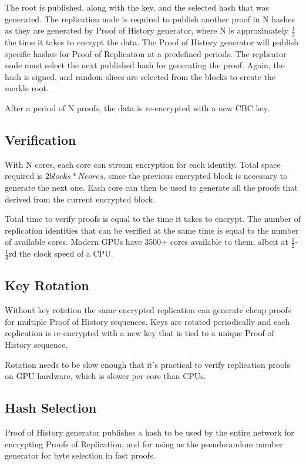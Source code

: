 \documentclass[12pt]{article}
\begin{document}
The root is published, along with the key, and the selected hash that was generated.  The replication node is required to publish another proof in N hashes as they are generated by Proof of History generator, where N is approximately \(\frac{1}{2}\) the time it takes to encrypt the data.  The Proof of History generator will publish specific hashes for Proof of Replication at a predefined periods.  The replicator node must select the next published hash for generating the proof.  Again, the hash is signed, and random slices are selected from the blocks to create the merkle root.

After a period of N proofs, the data is re-encrypted with a new CBC key.
\subsection{Verification}

With N cores, each core can stream encryption for each identity.  Total space required is \(2 blocks * N cores\), since the previous encrypted block is necessary to generate the next one. Each core can then be used to generate all the proofs that derived from the current encrypted block.

Total time to verify proofs is equal to the time it takes to encrypt.  The number of replication identities that can be verified at the same time is equal to the number of available cores.  Modern GPUs have 3500+ cores available to them, albeit at \(\frac{1}{2}\)-\(\frac{1}{3}\)rd the clock speed of a CPU.

\subsection{Key Rotation}

Without key rotation the same encrypted replication can generate cheap proofs for multiple Proof of History sequences.  Keys are rotated periodically and each replication is re-encrypted with a new key that is tied to a unique Proof of History sequence.

Rotation needs to be slow enough that it’s practical to verify replication proofs on GPU hardware, which is slower per core than CPUs.

\subsection{Hash Selection}\label{hashselection}

Proof of History generator publishes a hash to be used by the entire network for encrypting Proofs of Replication, and for using as the pseudorandom number generator for byte selection in fast proofs.
\end{document}
